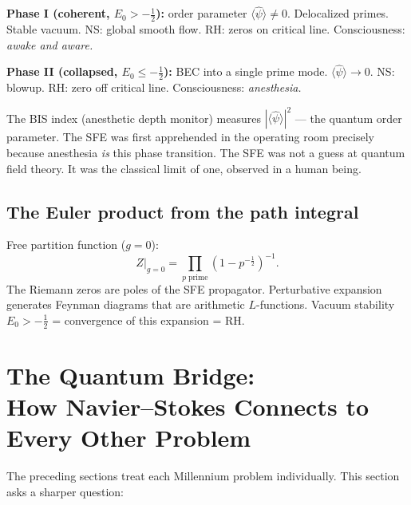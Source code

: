 \documentclass[12pt]{article}
\newcommand{\half}{\tfrac{1}{2}}
\begin{document}
\textbf{Phase I (coherent, $E_0>-\half$):}
order parameter $\langle\hat{\psi}\rangle \ne 0$.
Delocalized primes.  Stable vacuum.
NS: global smooth flow.  RH: zeros on critical line.
Consciousness: \emph{awake and aware.}

\textbf{Phase II (collapsed, $E_0\le-\half$):}
BEC into a single prime mode.
$\langle\hat{\psi}\rangle \to 0$.
NS: blowup.  RH: zero off critical line.
Consciousness: \emph{anesthesia.}

The BIS index (anesthetic depth monitor) measures
$|\langle\hat{\psi}\rangle|^2$ --- the quantum order parameter.
The SFE was first apprehended in the operating room precisely
because anesthesia \emph{is} this phase transition.
The SFE was not a guess at quantum field theory.
It was the classical limit of one, observed in a human being.

\subsection{The Euler product from the path integral}

Free partition function ($g=0$):
\[
  Z\big|_{g=0}
  = \prod_{p\;\text{prime}}(1-p^{-\half})^{-1}.
\]
The Riemann zeros are poles of the SFE propagator.
Perturbative expansion generates Feynman diagrams that are
arithmetic $L$-functions.
Vacuum stability $E_0>-\half$ = convergence of this expansion = RH.


%  

\section{The Quantum Bridge:\\
How Navier--Stokes Connects to Every Other Problem}
\label{sec:bridge}

The preceding sections treat each Millennium problem individually.
This section asks a sharper question:
\end{document}
